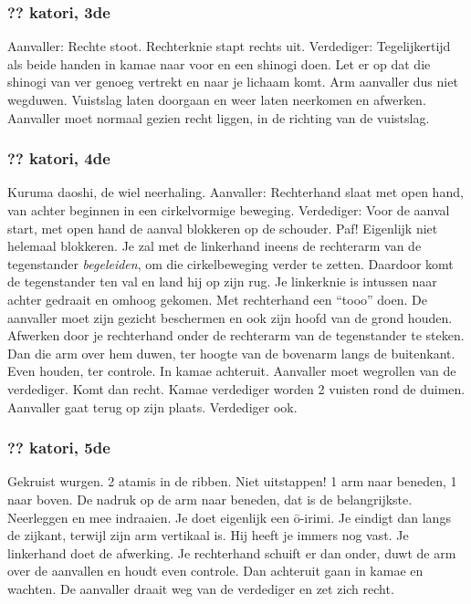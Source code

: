 \subsubsection{?? katori, 3de}
Aanvaller: Rechte stoot. Rechterknie stapt rechts uit.
Verdediger: Tegelijkertijd als beide handen in kamae naar voor en een shinogi doen.
Let er op dat die shinogi van ver genoeg vertrekt en naar je lichaam komt.
Arm aanvaller dus niet wegduwen.
Vuistslag laten doorgaan en weer laten neerkomen en afwerken.
Aanvaller moet normaal gezien recht liggen, in de richting van de vuistslag.

\subsubsection{?? katori, 4de}
Kuruma daoshi, de wiel neerhaling.
Aanvaller: Rechterhand slaat met open hand, van achter beginnen in een cirkelvormige beweging.
Verdediger: Voor de aanval start, met open hand de aanval blokkeren op de schouder. Paf!
Eigenlijk niet helemaal blokkeren. Je zal met de linkerhand ineens de rechterarm van de tegenstander \textit{begeleiden},
om die cirkelbeweging verder te zetten. Daardoor komt de tegenstander ten val en land hij op zijn rug.
Je linkerknie is intussen naar achter gedraait en omhoog gekomen.
Met rechterhand een ``tooo'' doen.
De aanvaller moet zijn gezicht beschermen en ook zijn hoofd van de grond houden.
Afwerken door je rechterhand onder de rechterarm van de tegenstander te steken. Dan die arm over hem duwen, ter hoogte van de bovenarm langs de buitenkant.
Even houden, ter controle.
In kamae achteruit.
Aanvaller moet wegrollen van de verdediger.
Komt dan recht.
Kamae verdediger worden 2 vuisten rond de duimen.
Aanvaller gaat terug op zijn plaats.
Verdediger ook.

\subsubsection{?? katori, 5de}
Gekruist wurgen.
2 atamis in de ribben.
Niet uitstappen!
1 arm naar beneden, 1 naar boven.
De nadruk op de arm naar beneden, dat is de belangrijkste.
Neerleggen en mee indraaien.
Je doet eigenlijk een \={o}-irimi.
Je eindigt dan langs de zijkant, terwijl zijn arm vertikaal is.
Hij heeft je immers nog vast.
Je linkerhand doet de afwerking.
Je rechterhand schuift er dan onder, duwt de arm over de aanvallen en houdt even controle.
Dan achteruit gaan in kamae en wachten.
De aanvaller draait weg van de verdediger en zet zich recht.

